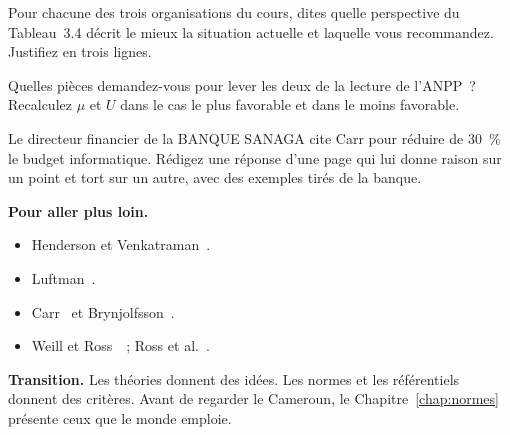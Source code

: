 \begin{boxexo}[title={\ding{45}\quad Exercice~3.2. Quelle perspective \niveaumoyen}]
Pour chacune des trois organisations du cours, dites quelle perspective du Tableau~3.4 décrit le mieux la situation actuelle et laquelle vous recommandez. Justifiez en trois lignes.
\end{boxexo}

\begin{boxexo}[title={\ding{45}\quad Exercice~3.3. Lever deux NEK \niveaumoyen}]
Quelles pièces demandez-vous pour lever les deux \NEK{} de la lecture de l'ANPP~? Recalculez $\mu$ et $U$ dans le cas le plus favorable et dans le moins favorable.
\end{boxexo}

\begin{boxexo}[title={\ding{45}\quad Exercice~3.4. Carr à la banque \niveauexpert}]
Le directeur financier de la BANQUE SANAGA cite Carr pour réduire de 30~\% le budget informatique. Rédigez une réponse d'une page qui lui donne raison sur un point et tort sur un autre, avec des exemples tirés de la banque.
\end{boxexo}

\bigskip

\begin{boxinfo}
\textbf{Pour aller plus loin.}
\begin{itemize}
    \item Henderson et Venkatraman~\cite{henderson1993}.
    \item Luftman~\cite{luftman2000}.
    \item Carr~\cite{carr2003} et Brynjolfsson~\cite{brynjolfsson1993}.
    \item Weill et Ross~\cite{weillross2004}~; Ross et al.~\cite{ross2006}.
\end{itemize}
\end{boxinfo}

\begin{boxinfo}
\textbf{Transition.} Les théories donnent des idées. Les normes et les référentiels donnent des critères. Avant de regarder le Cameroun, le Chapitre~\ref{chap:normes} présente ceux que le monde emploie.
\end{boxinfo}
